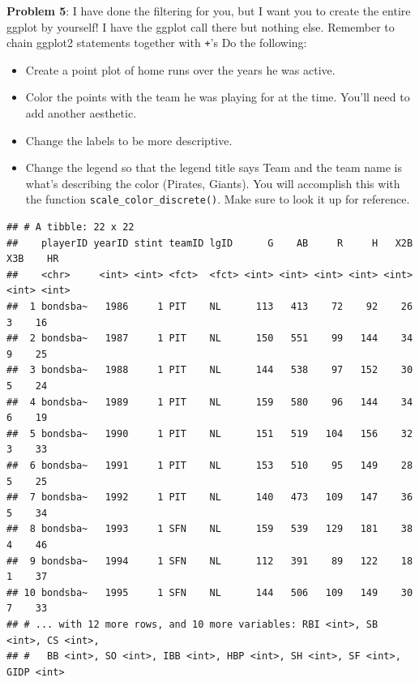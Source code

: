 \documentclass[
]{article}
\newenvironment{Shaded}{\begin{snugshade}}{\end{snugshade}}
\newcommand{\CommentTok}[1]{\textcolor[rgb]{0.56,0.35,0.01}{\textit{#1}}}
\newcommand{\KeywordTok}[1]{\textcolor[rgb]{0.13,0.29,0.53}{\textbf{#1}}}
\newcommand{\NormalTok}[1]{#1}
\newcommand{\OperatorTok}[1]{\textcolor[rgb]{0.81,0.36,0.00}{\textbf{#1}}}
\newcommand{\StringTok}[1]{\textcolor[rgb]{0.31,0.60,0.02}{#1}}
\providecommand{\tightlist}{%
  \setlength{\itemsep}{0pt}\setlength{\parskip}{0pt}}
\begin{document}
\textbf{Problem 5}: I have done the filtering for you, but I want you to
create the entire ggplot by yourself! I have the ggplot call there but
nothing else. Remember to chain ggplot2 statements together with
\texttt{+}'s Do the following:

\begin{itemize}
\tightlist
\item
  Create a point plot of home runs over the years he was active.
\item
  Color the points with the team he was playing for at the time. You'll
  need to add another aesthetic.
\item
  Change the labels to be more descriptive.
\item
  Change the legend so that the legend title says Team and the team name
  is what's describing the color (Pirates, Giants). You will accomplish
  this with the function \texttt{scale\_color\_discrete()}. Make sure to
  look it up for reference.
\end{itemize}

\begin{Shaded}
\end{Shaded}

\begin{verbatim}
## # A tibble: 22 x 22
##    playerID yearID stint teamID lgID      G    AB     R     H   X2B   X3B    HR
##    <chr>     <int> <int> <fct>  <fct> <int> <int> <int> <int> <int> <int> <int>
##  1 bondsba~   1986     1 PIT    NL      113   413    72    92    26     3    16
##  2 bondsba~   1987     1 PIT    NL      150   551    99   144    34     9    25
##  3 bondsba~   1988     1 PIT    NL      144   538    97   152    30     5    24
##  4 bondsba~   1989     1 PIT    NL      159   580    96   144    34     6    19
##  5 bondsba~   1990     1 PIT    NL      151   519   104   156    32     3    33
##  6 bondsba~   1991     1 PIT    NL      153   510    95   149    28     5    25
##  7 bondsba~   1992     1 PIT    NL      140   473   109   147    36     5    34
##  8 bondsba~   1993     1 SFN    NL      159   539   129   181    38     4    46
##  9 bondsba~   1994     1 SFN    NL      112   391    89   122    18     1    37
## 10 bondsba~   1995     1 SFN    NL      144   506   109   149    30     7    33
## # ... with 12 more rows, and 10 more variables: RBI <int>, SB <int>, CS <int>,
## #   BB <int>, SO <int>, IBB <int>, HBP <int>, SH <int>, SF <int>, GIDP <int>
\end{verbatim}
\end{document}
